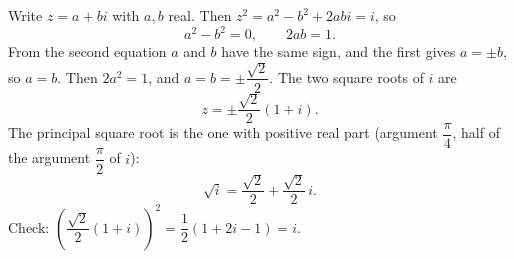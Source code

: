 Write $z=a+bi$ with $a,b$ real. Then $z^2=a^2-b^2+2abi=i$, so
\[
a^2-b^2=0,\qquad 2ab=1 .
\]
From the second equation $a$ and $b$ have the same sign, and the first gives $a=\pm b$, so $a=b$. Then $2a^2=1$, and $a=b=\pm\dfrac{\sqrt2}{2}$. The two square roots of $i$ are
\[
z=\pm\dfrac{\sqrt2}{2}(1+i).
\]
The principal square root is the one with positive real part (argument $\dfrac{\pi}{4}$, half of the argument $\dfrac{\pi}{2}$ of $i$):
\[
\sqrt i=\boxed{\dfrac{\sqrt2}{2}+\dfrac{\sqrt2}{2}\,i}.
\]
Check: $\left(\dfrac{\sqrt2}{2}(1+i)\right)^2=\dfrac{1}{2}(1+2i-1)=i$.
